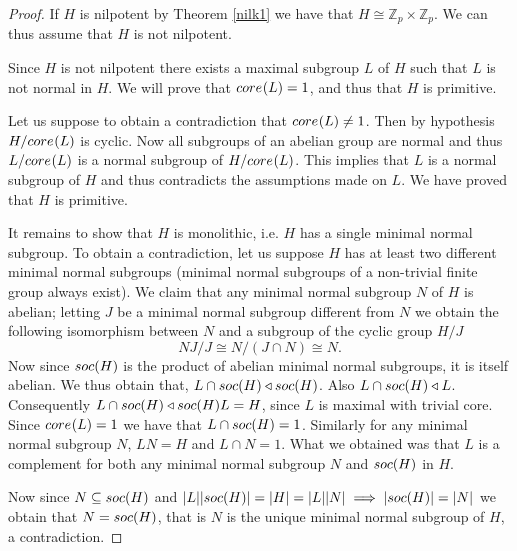 \begin{proof}
    If $H$ is nilpotent by Theorem \ref{nilk1} we have that $H \cong \mathbb{Z}_p \times \mathbb{Z}_p$. We can thus assume that $H$ is not nilpotent.

    Since $H$ is not nilpotent there exists a maximal subgroup $L$ of $H$ such that $L$ is not normal in $H$. We will prove that $core_{}({L}) = 1$, and thus that $H$ is primitive. 
    
    Let us suppose to obtain a contradiction that $core_{}({L}) \ne 1$. 
    Then by hypothesis $H/core_{}({L})$ is cyclic. Now all subgroups of an abelian group are normal and thus $L/core_{}({L})$ is a normal subgroup of $H/core_{}({L})$. 
    This implies that $L$ is a normal subgroup of $H$ and thus contradicts the assumptions made on $L$. We have proved that $H$ is primitive.

    It remains to show that $H$ is monolithic, i.e. $H$ has a single minimal normal subgroup. To obtain a contradiction, let us suppose $H$ has at least two different minimal normal subgroups (minimal normal subgroups of a non-trivial finite group always exist). We claim that any minimal normal subgroup $N$ of $H$ is abelian; letting $J$ be a minimal normal subgroup different from $N$ we obtain the following isomorphism between $N$ and a subgroup of the cyclic group $H/J$
    $$
        NJ/J \cong N/(J \cap N) \cong N.
    $$
    Now since $soc {(H)}$ is the product of abelian minimal normal subgroups, it is itself abelian. We thus obtain that, $L \cap soc {(H)} \triangleleft soc {(H)}$. Also $L \cap soc {(H)} \triangleleft L$. Consequently $L \cap soc {(H)} \triangleleft soc {(H)}L = H$, since $L$ is maximal with trivial core.
    Since $core_{}({L}) = 1$ we have that $L \cap soc {(H)} = 1$. Similarly for any minimal normal subgroup $N$, $LN=H$ and $L \cap N = 1$. What we obtained was that $L$ is a complement for both any minimal normal subgroup $N$ and $soc {(H)}$ in $H$.

    Now since $N \subseteq soc {(H)}$ and $| L || soc {(H)} | = | H | = | L || N | \implies | soc {(H)} | = | N |$ we obtain that $N = soc {(H)}$, that is $N$ is the unique minimal normal subgroup of $H$, a contradiction.
\end{proof}
